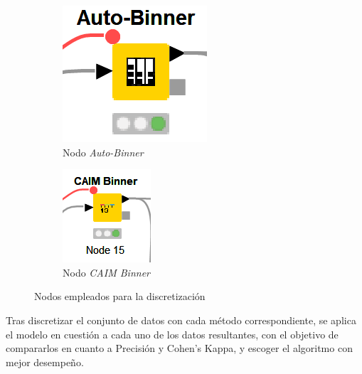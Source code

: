 \begin{figure}[H]
	\centering
	\begin{subfigure}[b]{0.25\linewidth}
		\centering
		\includegraphics[width=0.5\linewidth]{"figuras/capi 2/auto-binner-nodo"}
		\caption{Nodo \textit{Auto-Binner}}
		\label{fig:auto-binner-nodo}
	\end{subfigure}
	\hspace{1.5cm}
	\begin{subfigure}[b]{0.25\linewidth}
		\centering
		\includegraphics[width=0.5\linewidth]{"figuras/capi 2/caim-binner-nodo"}
		\caption{Nodo \textit{CAIM Binner}}
		\label{fig:caim-binner-nodo}
	\end{subfigure}
	\caption{Nodos empleados para la discretización}
	\label{fig:discretizacion-nodos}
\end{figure}

Tras discretizar el conjunto de datos con cada método correspondiente, se aplica el modelo en cuestión a cada uno de los datos resultantes, con el objetivo de compararlos en cuanto a Precisión y Cohen's Kappa, y escoger el algoritmo con mejor desempeño. 

